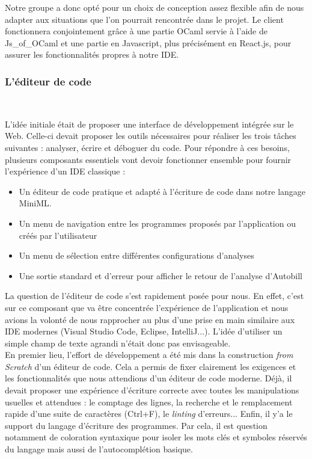 \documentclass[12pt]{article}
\begin{document}
Notre groupe a donc opté pour un choix de conception assez flexible afin de nous adapter aux situations que l'on pourrait rencontrée dans le projet. Le client fonctionnera conjointement grâce à une partie OCaml servie à l'aide de Js\_of\_OCaml et une partie en Javascript, plus précisément en React.js, pour assurer les fonctionnalités propres à notre IDE.

\subsubsection{L'éditeur de code}\

L'idée initiale était de proposer une interface de développement intégrée sur le Web. Celle-ci devait proposer les outils nécessaires pour réaliser les trois tâches suivantes : analyser, écrire et déboguer du code. Pour répondre à ces besoins, plusieurs composants essentiels vont devoir fonctionner ensemble pour fournir l'expérience d'un IDE classique :
\begin{itemize}
      \item Un éditeur de code pratique et adapté à l'écriture de code dans notre langage MiniML.
      \item Un menu de navigation entre les programmes proposés par l'application ou créés par l'utilisateur
      \item Un menu de sélection entre différentes configurations d'analyses
      \item Une sortie standard et d'erreur pour afficher le retour de l'analyse d'Autobill \\
\end{itemize}

La question de l'éditeur de code s'est rapidement posée pour nous. En effet, c'est sur ce composant que va être concentrée l'expérience de l'application et nous avions la volonté de nous rapprocher au plus d'une prise en main similaire aux IDE modernes (Visual Studio Code, Eclipse, IntelliJ...). L'idée d'utiliser un simple champ de texte agrandi n'était donc pas envisageable. \\

En premier lieu, l'effort de développement a été mis dans la construction \textit{from Scratch} d'un éditeur de code. Cela a permis de fixer clairement les exigences et les fonctionnalités que nous attendions d'un éditeur de code moderne. Déjà, il devait proposer une expérience d'écriture correcte avec toutes les manipulations usuelles et attendues : le comptage des lignes, la recherche et le remplacement rapide d'une suite de caractères (Ctrl+F), le \textit{linting} d'erreurs... Enfin, il y'a le support du langage d'écriture des programmes. Par cela, il est question notamment de coloration syntaxique pour isoler les mots clés et symboles réservés du langage mais aussi de l'autocomplétion basique.  \\
\end{document}
